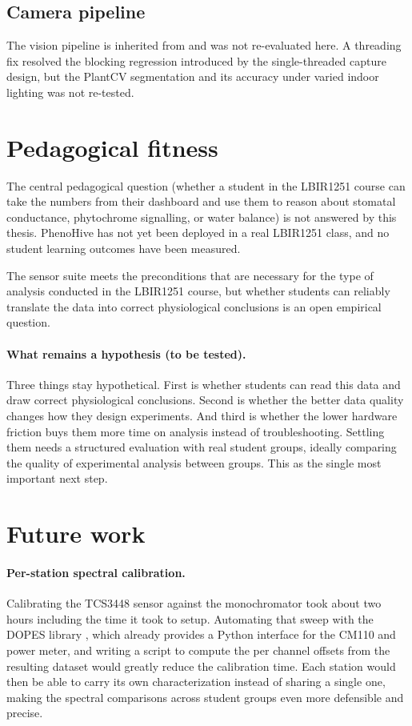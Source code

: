 \subsection{Camera pipeline}

The vision pipeline is inherited from \textcite{colinet2025} and was not re-evaluated here. A threading fix resolved the blocking regression introduced by the single-threaded capture design, but the PlantCV segmentation and its accuracy under varied indoor lighting was not re-tested.

\section{Pedagogical fitness}

The central pedagogical question (whether a student in the LBIR1251 course can take the numbers from their dashboard and use them to reason about stomatal conductance, phytochrome signalling, or water balance) is not answered by this thesis. PhenoHive has not yet been deployed in a real LBIR1251 class, and no student learning outcomes have been measured. 

The sensor suite meets the preconditions that are necessary for the type of analysis conducted in the LBIR1251 course, but whether students can reliably translate the data into correct physiological conclusions is an open empirical question.

\paragraph{What remains a hypothesis (to be tested).}
Three things stay hypothetical. First is whether students can read this data and draw correct physiological conclusions. Second is whether the better data quality changes how they design experiments. And third is whether the lower hardware friction buys them more time on analysis instead of troubleshooting. Settling them needs a structured evaluation with real student groups, ideally comparing the quality of experimental analysis between groups. This as the single most important next step.

\section{Future work}
\label{sec:future-work}

\paragraph{Per-station spectral calibration.}
Calibrating the TCS3448 sensor against the monochromator took about two hours including the time it took to setup. Automating that sweep with the DOPES library \parencite{dopes}, which already provides a Python interface for the CM110 and power meter, and writing a script to compute the per channel offsets from the resulting dataset would greatly reduce the calibration time. Each station would then be able to carry its own characterization instead of sharing a single one, making the spectral comparisons across student groups even more defensible and precise.

